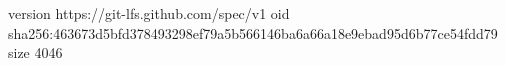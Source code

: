 version https://git-lfs.github.com/spec/v1
oid sha256:463673d5bfd378493298ef79a5b566146ba6a66a18e9ebad95d6b77ce54fdd79
size 4046
